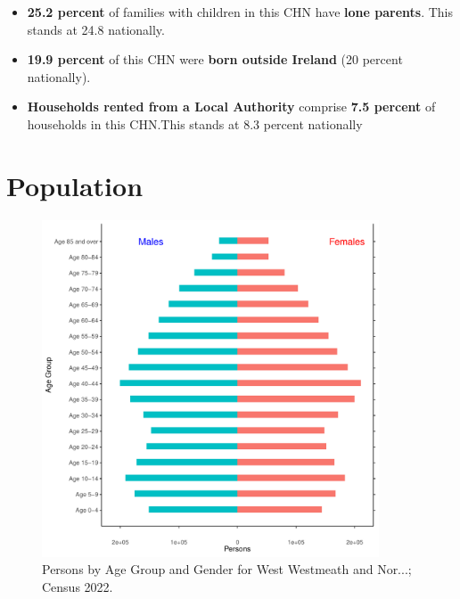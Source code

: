 \documentclass{article}
\begin{document}
\begin{itemize}
\item \textbf{25.2 percent} of families with children in this CHN have \textbf{lone parents}. This stands at 24.8 nationally.

\item \textbf{19.9 percent} of this CHN were \textbf{born outside Ireland} (20 percent nationally).

\item \textbf{Households rented from a Local Authority} comprise \textbf{7.5 percent} of households in this CHN.This stands at 8.3 percent nationally

\end{itemize}

\pagebreak

\section{Population} 
\label{sect:Pop}

\begin{figure}[h]
	\centering
	\includegraphics[width = 100mm]{../figures/PyramidPlot.pdf}
	\caption{Persons by Age Group and Gender for West Westmeath and Nor...; Census 2022.}
	\label{fig:2ae19629-1a6a-13a3-e055-000000000001}
	\end{figure}
\end{document}
